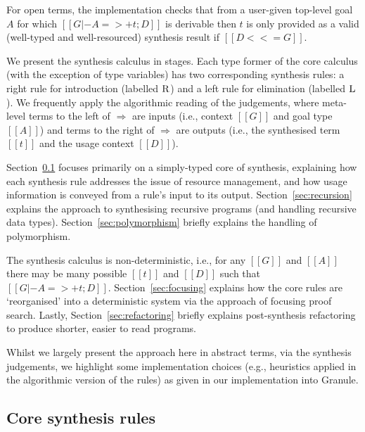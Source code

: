 For open terms, the implementation
checks that from a user-given top-level goal $A$ for which $[[ G |- A =>+ t ; D ]]$ is
derivable then $t$ is only provided as a valid
(well-typed and well-resourced) synthesis result if $[[ D <<= G ]]$.

We present the synthesis calculus in stages.
Each type former of the core calculus (with the exception of type
variables) has two corresponding synthesis rules: a right rule for
introduction (labelled $\textsc{R}$) and a left rule for elimination
(labelled $\textsc{L}$).
We frequently apply the algorithmic reading of the judgements, where meta-level terms to the left of $\Rightarrow$ are inputs (i.e., context $[[ G ]]$ and goal type $[[ A ]]$) and terms to the right of $\Rightarrow$
are outputs (i.e., the synthesised term $[[ t ]]$ and the usage context $[[ D ]]$).

Section~\ref{subsection:rules} focuses primarily on a
simply-typed core of synthesis, explaining how each synthesis
rule addresses the issue of resource management, and how usage
information is conveyed from a rule's input to its output.
Section~\ref{sec:recursion} explains
the approach to synthesising recursive programs (and handling recursive data types).
Section~\ref{sec:polymorphism} briefly explains the handling of polymorphism.

The synthesis calculus is non-deterministic, i.e., for any $[[ G ]]$
and $[[ A ]]$ there may be many possible $[[ t ]]$ and $[[ D ]]$ such
that $[[ G |- A =>+ t ; D ]]$. Section~\ref{sec:focusing} explains how
the core rules are `reorganised' into a deterministic system via the
approach of focusing proof search.  Lastly,
Section~\ref{sec:refactoring} briefly explains post-synthesis
refactoring to produce shorter, easier to read programs.

Whilst we largely present the approach here in abstract terms, via the synthesis judgements,
we highlight some implementation choices (e.g., heuristics
applied in the algorithmic version of the rules) as given in our implementation into Granule.

\subsection{Core synthesis rules}
\label{subsection:rules}

